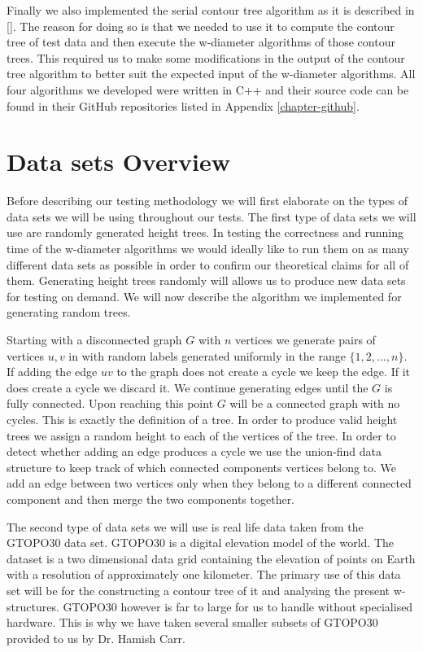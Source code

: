 Finally we also implemented the serial contour tree algorithm as it is described in []. The reason for doing so is that we needed to use it to compute the contour tree of test data and then execute the w-diameter algorithms of those contour trees. This required us to make some modifications in the output of the contour tree algorithm to better suit the expected input of the w-diameter algorithms. All four algorithms we developed were written in C++ and their source code can be found in their GitHub repositories listed in Appendix \ref{chapter-github}.


\section{Data sets Overview}

Before describing our testing methodology we will first elaborate on the types of data sets we will be using throughout our tests. The first type of data sets we will use are randomly generated height trees. In testing the correctness and running time of the w-diameter algorithms we would ideally like to run them on as many different data sets as possible in order to confirm our theoretical claims for all of them. Generating height trees randomly will allows us to produce new data sets for testing on demand. We will now describe the algorithm we implemented for generating random trees.

Starting with a disconnected graph $G$ with $n$ vertices we generate pairs of vertices $u, v$ in with random labels generated uniformly in the range $\{1, 2, ..., n\}$. If adding the edge $uv$ to the graph does not create a cycle we keep the edge. If it does create a cycle we discard it. We continue generating edges until the $G$ is fully connected. Upon reaching this point $G$ will be a connected graph with no cycles. This is exactly the definition of a tree. In order to produce valid height trees we assign a random height to each of the vertices of the tree. In order to detect whether adding an edge produces a cycle we use the union-find data structure to keep track of which connected components vertices belong to. We add an edge between two vertices only when they belong to a different connected component and then merge the two components together.

The second type of data sets we will use is real life data taken from the GTOPO30 data set. GTOPO30 \cite{gtopo} is a digital elevation model of the world. The dataset is a two dimensional data grid containing the elevation of points on Earth with a resolution of approximately one kilometer. The primary use of this data set will be for the constructing a contour tree of it and analysing the present w-structures. GTOPO30 however is far to large for us to handle without specialised hardware. This is why we have taken several smaller subsets of GTOPO30 provided to us by Dr. Hamish Carr.

